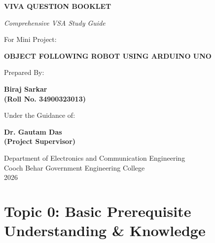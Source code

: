 \documentclass[12pt,a4paper,oneside]{report}
\begin{document}
\begin{titlepage}
\centering
{}
\vspace*{0.8in}
{\fontsize{26}{32}\selectfont\bfseries VIVA QUESTION BOOKLET\par}
\vspace{0.4in}
{\fontsize{18}{22}\selectfont\itshape Comprehensive VSA Study Guide\par}
\vspace{0.8in}
{\fontsize{16}{20}\selectfont For Mini Project:\par}
\vspace{0.2in}
{\fontsize{20}{26}\selectfont\bfseries OBJECT FOLLOWING ROBOT USING ARDUINO UNO\par}
\vfill
{\fontsize{14}{18}\selectfont Prepared By:\par}
{\fontsize{16}{20}\selectfont\bfseries Biraj Sarkar \\ (Roll No. 34900323013)\par}
\vspace{0.5in}
{\fontsize{14}{18}\selectfont Under the Guidance of:\par}
{\fontsize{16}{20}\selectfont\bfseries Dr. Gautam Das \\ (Project Supervisor)\par}
\vfill
{\fontsize{12}{16}\selectfont Department of Electronics and Communication Engineering \\ Cooch Behar Government Engineering College \\ 2026\par}
\end{titlepage}


\newpage
\begin{singlespace}
\begingroup
\titleformat{\chapter}[block]
  {\normalfont\fontsize{22}{26}\selectfont\bfseries\centering}
  {}{0pt}{}
\tableofcontents
\endgroup
\end{singlespace}
\clearpage


\chapter{Topic 0: Basic Prerequisite Understanding \& Knowledge}
\end{document}
